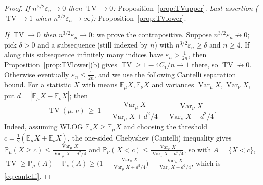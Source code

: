 \documentclass[12pt]{article}
\theoremstyle{definition}
\DeclareMathOperator{\TV}{TV}
\DeclareMathOperator{\Var}{Var}
\newcommand{\E}{\mathbb{E}}
\newcommand{\PP}{\mathbb{P}}
\newcommand{\eps}{\varepsilon}
\begin{document}
\begin{proof}
\emph{If $n^{3/2}\eps_n\to0$ then $\TV\to0$:} Proposition~\ref{prop:TVupper}. \emph{Last
assertion ($\TV\to1$ when $n^{3/2}\eps_n\to\infty$):} Proposition~\ref{prop:TVlower}.

\emph{If $\TV\to0$ then $n^{3/2}\eps_n\to0$:} we prove the contrapositive. Suppose
$n^{3/2}\eps_n\not\to0$; pick $\delta>0$ and a subsequence (still indexed by $n$) with
$n^{3/2}\eps_n\ge\delta$ and $n\ge4$. If along this subsequence infinitely many indices
have $\eps_n>\tfrac1{2n}$, then Proposition~\ref{prop:TVlower}(b) gives
$\TV\ge1-4C_1/n\to1$ there, so $\TV\not\to0$. Otherwise eventually $\eps_n\le\tfrac1{2n}$,
and we use the following Cantelli separation bound. For a statistic $X$ with means
$\E_\mu X,\E_\nu X$ and variances $\Var_\mu X,\Var_\nu X$, put $d=|\E_\mu X-\E_\nu X|$;
then
\begin{equation}\label{eq:cantelli}
\TV(\mu,\nu)\ \ge\ 1-\frac{\Var_\mu X}{\Var_\mu X+d^2/4}-\frac{\Var_\nu X}{\Var_\nu X+d^2/4}.
\end{equation}
Indeed, assuming WLOG $\E_\nu X\ge\E_\mu X$ and choosing the threshold
$c=\tfrac12(\E_\mu X+\E_\nu X)$, the one-sided Chebyshev (Cantelli) inequality gives
$\PP_\mu(X\ge c)\le \frac{\Var_\mu X}{\Var_\mu X+d^2/4}$ and
$\PP_\nu(X< c)\le \frac{\Var_\nu X}{\Var_\nu X+d^2/4}$, so with $A=\{X<c\}$,
$\TV\ge \PP_\mu(A)-\PP_\nu(A)\ge\big(1-\frac{\Var_\mu X}{\Var_\mu X+d^2/4}\big)
-\frac{\Var_\nu X}{\Var_\nu X+d^2/4}$, which is \eqref{eq:cantelli}.


\end{proof}
\end{document}
